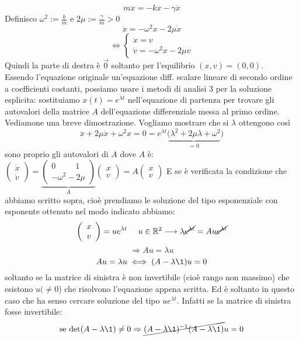 \documentclass[Main.tex]{subfiles}
\begin{document}
\newpage
\renewcommand{\tem}{$\L$}
\begin{tema}
\begin{equation}\label{smorzato}
m \ddot x = -kx - \gamma \dot x
\end{equation}
Definisco $\omega^2:= \frac{k}{m}$ e $2 \mu := \frac{\gamma}{m}>0$
$$
\ddot x = - \omega^2 x - 2 \mu \dot x
$$
$$
\iff \begin{cases}
	\dot x = v\\
	\dot v= -\omega^2 x - 2 \mu v
\end{cases}
$$
Quindi la parte di destra è $\vec 0$ soltanto per l'equilibrio $(x,v)=(0,0)$.\\
Essendo l'equazione originale un'equazione diff. scalare lineare di secondo ordine a coefficienti costanti, possiamo usare i metodi di analisi 3 per la soluzione esplicita: sostituiamo $x(t)= e^{\lambda t}$ nell'equazione di partenza per trovare gli autovalori della matrice $A$ dell'equazione differenziale messa al primo ordine. Vediamone una breve dimostrazione. Vogliamo mostrare che si $\lambda$ ottengono così 
$$
\ddot x + 2 \mu \dot x + \omega^2 x =0= e^{\lambda t} \underbrace{(\lambda^2 + 2 \mu \lambda + \omega^2}_{=0} )
$$
sono proprio gli autovalori di $A$ dove $A$ è:
$\left( \begin{array}{c}
 \dot x \\ \dot v
 \end{array} \right)  =  \underbrace{\left(  \begin{array}{c}
 	0 \ \ \ \ \ \ \ \ \ \ \ 1 \\ -\omega^2 -2 \mu \end{array} \right)  }_{A} 
  \left( \begin{array}{c}
 	x \\ v
 \end{array} \right)  = A \left( \begin{array}{c}
 	x \\ v
 \end{array} \right) $
E se è verificata la condizione che abbiamo scritto sopra, cioè prendiamo le soluzione del tipo esponenziale con esponente ottenuto nel modo indicato abbiamo:
 $$
 \left( \begin{array}{c}
 x \\ v
 \end{array} \right)  = u e^{\lambda t} \ \ \ \ u \in \mathbb{R}^2 \longrightarrow \lambda\cancel{e^{\lambda t}}= A u \cancel{e^{\lambda t}}
 $$
 $$
 \Rightarrow Au = \lambda u
 $$
 $$
 Au = \lambda u  \iff (A - \lambda \1)u=0
 $$
 soltanto se la matrice di sinistra è non invertibile (cioè rango non massimo) che esistono $u( \neq 0$) che risolvono l'equazione appena scritta. Ed è soltanto in questo caso che ha senso cercare soluzione del tipo $u e^{\lambda t}$. Infatti se la matrice di sinistra fosse invertibile:
 $$
 \text{se det} (A-\lambda \1) \neq 0 \Rightarrow \cancel{(A-\lambda \1)^{-1}(A-\lambda \1)}u=0
$$


\end{tema}
\end{document}
